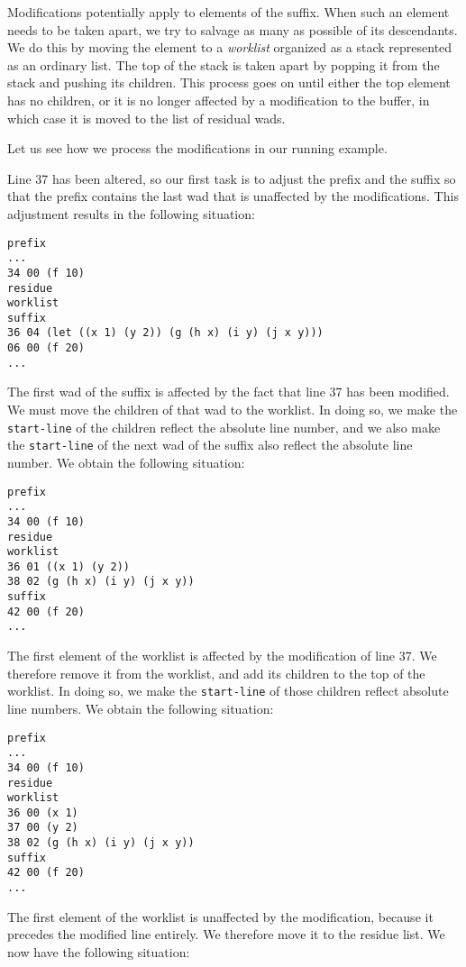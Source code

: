 Modifications potentially apply to elements of the suffix.  When such
an element needs to be taken apart, we try to salvage as many as
possible of its descendants.  We do this by moving the element to a
\emph{worklist} organized as a stack represented as an ordinary
\commonlisp{} list.  The top of the stack is taken apart by popping it
from the stack and pushing its children.  This process goes on until
either the top element has no children, or it is no longer affected by
a modification to the buffer, in which case it is moved to the list of
residual wads.

Let us see how we process the modifications in our running example.

Line 37 has been altered, so our first task is to adjust the prefix
and the suffix so that the prefix contains the last wad that
is unaffected by the modifications.  This adjustment results in the
following situation:

\begin{verbatim}
prefix
...
34 00 (f 10)
residue
worklist
suffix
36 04 (let ((x 1) (y 2)) (g (h x) (i y) (j x y)))
06 00 (f 20)
...
\end{verbatim}

The first wad of the suffix is affected by the fact that line
37 has been modified.  We must move the children of that wad
to the worklist.  In doing so, we make the \texttt{start-line} of the
children reflect the absolute line number, and we also make the
\texttt{start-line} of the next wad of the suffix also
reflect the absolute line number.  We obtain the following situation:

\begin{verbatim}
prefix
...
34 00 (f 10)
residue
worklist
36 01 ((x 1) (y 2))
38 02 (g (h x) (i y) (j x y))
suffix
42 00 (f 20)
...
\end{verbatim}

The first element of the worklist is affected by the modification of
line 37.  We therefore remove it from the worklist, and add its
children to the top of the worklist.  In doing so, we make the
\texttt{start-line} of those children reflect absolute line numbers.
We obtain the following situation:

\begin{verbatim}
prefix
...
34 00 (f 10)
residue
worklist
36 00 (x 1)
37 00 (y 2)
38 02 (g (h x) (i y) (j x y))
suffix
42 00 (f 20)
...
\end{verbatim}

The first element of the worklist is unaffected by the modification,
because it precedes the modified line entirely.  We therefore move it
to the residue list.  We now have the following situation:

